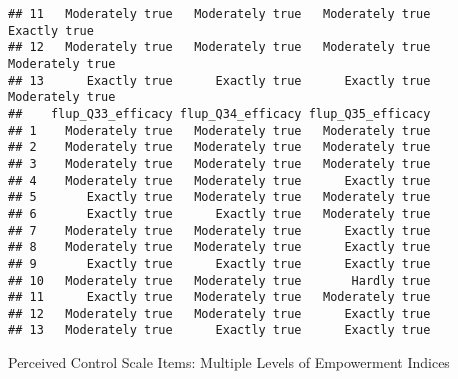 \documentclass[]{article}
\begin{document}
\begin{verbatim}
## 11   Moderately true   Moderately true   Moderately true      Exactly true
## 12   Moderately true   Moderately true   Moderately true   Moderately true
## 13      Exactly true      Exactly true      Exactly true   Moderately true
##    flup_Q33_efficacy flup_Q34_efficacy flup_Q35_efficacy
## 1    Moderately true   Moderately true   Moderately true
## 2    Moderately true   Moderately true   Moderately true
## 3    Moderately true   Moderately true   Moderately true
## 4    Moderately true   Moderately true      Exactly true
## 5       Exactly true   Moderately true   Moderately true
## 6       Exactly true      Exactly true   Moderately true
## 7    Moderately true   Moderately true      Exactly true
## 8    Moderately true   Moderately true      Exactly true
## 9       Exactly true      Exactly true      Exactly true
## 10   Moderately true   Moderately true       Hardly true
## 11      Exactly true   Moderately true   Moderately true
## 12   Moderately true   Moderately true      Exactly true
## 13   Moderately true      Exactly true      Exactly true
\end{verbatim}

Perceived Control Scale Items: Multiple Levels of Empowerment Indices
\end{document}
